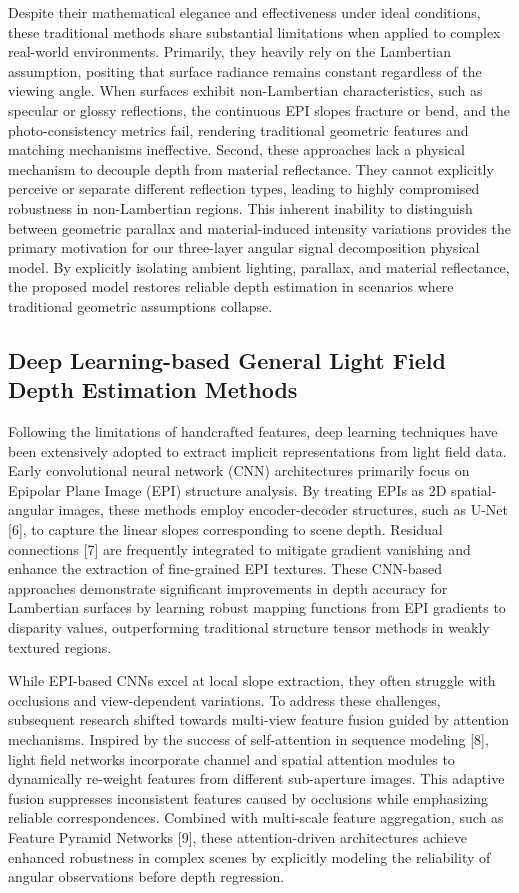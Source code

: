 Despite their mathematical elegance and effectiveness under ideal conditions, these traditional methods share substantial limitations when applied to complex real-world environments. Primarily, they heavily rely on the Lambertian assumption, positing that surface radiance remains constant regardless of the viewing angle. When surfaces exhibit non-Lambertian characteristics, such as specular or glossy reflections, the continuous EPI slopes fracture or bend, and the photo-consistency metrics fail, rendering traditional geometric features and matching mechanisms ineffective. Second, these approaches lack a physical mechanism to decouple depth from material reflectance. They cannot explicitly perceive or separate different reflection types, leading to highly compromised robustness in non-Lambertian regions. This inherent inability to distinguish between geometric parallax and material-induced intensity variations provides the primary motivation for our three-layer angular signal decomposition physical model. By explicitly isolating ambient lighting, parallax, and material reflectance, the proposed model restores reliable depth estimation in scenarios where traditional geometric assumptions collapse.

\subsection{Deep Learning-based General Light Field Depth Estimation Methods}

Following the limitations of handcrafted features, deep learning techniques have been extensively adopted to extract implicit representations from light field data. Early convolutional neural network (CNN) architectures primarily focus on Epipolar Plane Image (EPI) structure analysis. By treating EPIs as 2D spatial-angular images, these methods employ encoder-decoder structures, such as U-Net [6], to capture the linear slopes corresponding to scene depth. Residual connections [7] are frequently integrated to mitigate gradient vanishing and enhance the extraction of fine-grained EPI textures. These CNN-based approaches demonstrate significant improvements in depth accuracy for Lambertian surfaces by learning robust mapping functions from EPI gradients to disparity values, outperforming traditional structure tensor methods in weakly textured regions.

While EPI-based CNNs excel at local slope extraction, they often struggle with occlusions and view-dependent variations. To address these challenges, subsequent research shifted towards multi-view feature fusion guided by attention mechanisms. Inspired by the success of self-attention in sequence modeling [8], light field networks incorporate channel and spatial attention modules to dynamically re-weight features from different sub-aperture images. This adaptive fusion suppresses inconsistent features caused by occlusions while emphasizing reliable correspondences. Combined with multi-scale feature aggregation, such as Feature Pyramid Networks [9], these attention-driven architectures achieve enhanced robustness in complex scenes by explicitly modeling the reliability of angular observations before depth regression.

